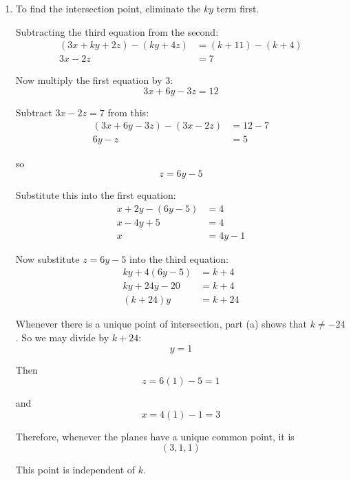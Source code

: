 \documentclass[leqno]{article}
\begin{document}
\begin{enumerate}[
  label=\textbf{\arabic*.},
  leftmargin=*,
  topsep=0pt,
  partopsep=0pt,
  parsep=0pt
]
\begin{djsSolution}
\begin{enumerate}[label=\textbf{(\alph*)}]
So
\[
\det(\mathbf{A})\neq 0 \iff -(k+24)\neq 0 \iff k\neq -24
\]

Hence the planes have a unique point of intersection for all values of $k$ except
\[
k=-24
\]

  \item To find the intersection point, eliminate the $ky$ term first.

Subtracting the third equation from the second:
\begin{align*}
(3x+ky+2z)-(ky+4z)&=(k+11)-(k+4)\\
3x-2z&=7
\end{align*}

Now multiply the first equation by $3$:
\[
3x+6y-3z=12
\]

Subtract $3x-2z=7$ from this:
\begin{align*}
(3x+6y-3z)-(3x-2z)&=12-7\\
6y-z&=5
\end{align*}

so
\[
z=6y-5
\]

Substitute this into the first equation:
\begin{align*}
x+2y-(6y-5)&=4\\
x-4y+5&=4\\
x&=4y-1
\end{align*}

Now substitute $z=6y-5$ into the third equation:
\begin{align*}
ky+4(6y-5)&=k+4\\
ky+24y-20&=k+4\\
(k+24)y&=k+24
\end{align*}

Whenever there is a unique point of intersection, part (a) shows that $k\neq -24$. So we may divide by $k+24$:
\[
y=1
\]

Then
\[
z=6(1)-5=1
\]

and
\[
x=4(1)-1=3
\]

Therefore, whenever the planes have a unique common point, it is
\[
(3,1,1)
\]

This point is independent of $k$.
\end{enumerate}
\end{djsSolution}


\end{enumerate}
\end{document}
